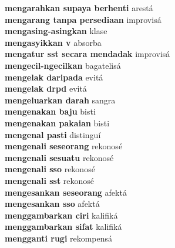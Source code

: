\textbf{ mengarahkan supaya berhenti  } arestá \\
\textbf{ mengarang tanpa persediaan  } improvisá \\
\textbf{ mengasing-asingkan  } klase \\
\textbf{ mengasyikkan v  } absorba \\
\textbf{ mengatur sst secara mendadak  } improvisá \\
\textbf{ mengecil-ngecilkan  } bagatelisá \\
\textbf{ mengelak daripada  } evitá \\
\textbf{ mengelak drpd  } evitá \\
\textbf{ mengeluarkan darah  } sangra \\
\textbf{ mengenakan baju  } bisti \\
\textbf{ mengenakan pakaian  } bisti \\
\textbf{ mengenal pasti  } distinguí \\
\textbf{ mengenali seseorang  } rekonosé \\
\textbf{ mengenali sesuatu  } rekonosé \\
\textbf{ mengenali sso  } rekonosé \\
\textbf{ mengenali sst  } rekonosé \\
\textbf{ mengesankan seseorang  } afektá \\
\textbf{ mengesankan sso  } afektá \\
\textbf{ menggambarkan ciri  } kalifiká \\
\textbf{ menggambarkan sifat  } kalifiká \\
\textbf{ mengganti rugi  } rekompensá \\

